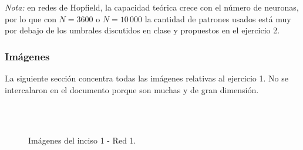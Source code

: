 \documentclass[11pt]{article} %
\begin{document}
\textit{Nota:} en redes de Hopfield, la capacidad teórica crece con el número de neuronas, por lo que con $N=3600$ o $N=10\,000$ la cantidad de patrones usados está muy por debajo de los umbrales discutidos en clase y propuestos en el ejercicio 2. 

\subsubsection{Imágenes}
La siguiente sección concentra todas las imágenes relativas al ejercicio 1. No se intercalaron en el documento porque son muchas y de gran dimensión. 
\clearpage
\begin{figure}[p]
    \centering
    \\
    \\
    \caption{Imágenes del inciso 1 - Red 1.}
    \label{fig:ej1_a}
\end{figure}
\end{document}
